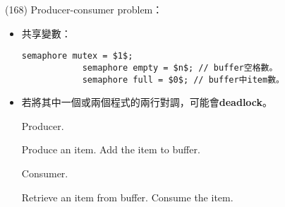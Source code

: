 \begin{theorem}{(168)} Producer-consumer problem：\begin{itemize}
        \item 共享變數：\begin{lstlisting}[caption={Shared variables of Producer-consumer problem.}, captionpos=b, mathescape=true]
            semaphore mutex = $1$;
            semaphore empty = $n$; // buffer空格數。
            semaphore full = $0$; // buffer中item數。
        \end{lstlisting}
        \item 若將其中一個或兩個程式的兩行對調，可能會\textbf{deadlock}。
        \begin{algorithm}[H]
            \caption{Producer.}
            \begin{algorithmic}[1]
                    \Repeat
                        \State Produce an item.
                        \State {}
                        \State {}
                        \State Add the item to buffer.
                        \State {}
                        \State {}
                \EndFunction
            \end{algorithmic}
        \end{algorithm}
        \begin{algorithm}[H]
            \caption{Consumer.}
            \begin{algorithmic}[1]
                    \Repeat
                        \State {}
                        \State {}
                        \State Retrieve an item from buffer.
                        \State {}
                        \State {}
                        \State Consume the item.
                \EndFunction
            \end{algorithmic}
        \end{algorithm}
    \end{itemize}
\end{theorem}

